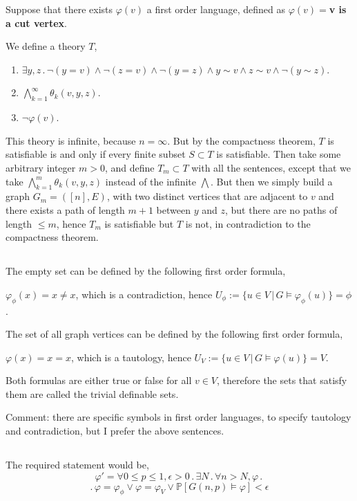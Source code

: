 \documentclass{article}
\begin{document}
Suppose that there exists $\varphi(v)$ a first order language, defined as $\varphi(v)=$\textbf{v is a cut vertex}.

We define a theory $T$,
\begin{enumerate}
    \item $\exists{y,z}\,.\,\neg(y=v)\land\neg(z=v)\land\neg(y=z)\land{y\sim{v}}\land{z\sim{v}}\land\neg(y\sim{z})$.
    \item 
    $\bigwedge_{k=1}^\infty\theta_k(v,y,z)$.
    \item 
    $\neg\varphi(v)$.
\end{enumerate}

This theory is infinite, because $n=\infty$. But by the compactness theorem, $T$ is satisfiable is and only if every finite subset $S\subset{T}$ is satisfiable.
Then take some arbitrary integer $m>0$, and define $T_m\subset{T}$ with all the sentences, except that we take $\bigwedge_{k=1}^m\theta_k(v,y,z)$ instead of the infinite $\bigwedge$.
But then we simply build a graph $G_m=([n],E)$, with two distinct vertices that are adjacent to $v$ and there exists a path of length $m+1$ between $y$ and $z$, but there are no paths of length $\leq{m}$, hence $T_m$ is satisfiable but $T$ is not, in contradiction to the compactness theorem.
\subsection{}
The empty set can be defined by the following first order formula,

$\varphi_\phi(x)=x\neq{x}$, which is a contradiction, hence $U_\phi:=\{u\in{V}\,|\,{G\vDash\varphi_\phi(u)}\}=\phi$.

The set of all graph vertices can be defined by the following first order formula,

$\varphi(x)=x=x$, which is a tautology, hence $U_V:=\{u\in{V}\,|\,{G\vDash\varphi(u)}\}=V$.

Both formulas are either true or false for all $v\in{V}$, therefore the sets that satisfy them are called the trivial definable sets.

Comment: there are specific symbols in first order languages, to specify tautology and contradiction, but I prefer the above sentences.
\subsection{}
The required statement would be,
\noindent
\[\varphi'=\forall{0\leq{p}\leq{1}},\epsilon>0\,.\,\exists{N}\,.\,\forall{n>N},\varphi\,.\,\]\[.\,\varphi=\varphi_\phi\lor\varphi=\varphi_V\lor\mathbb{P}[G(n,p)\vDash\varphi]<\epsilon\]
\end{document}
